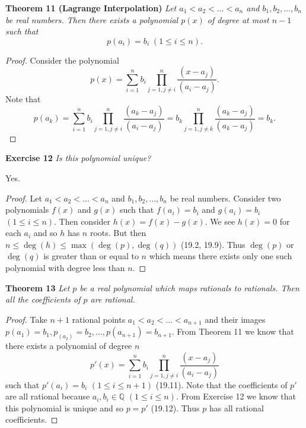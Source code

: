 \documentclass{article}
\begin{document}
\begin{flushleft}
\textbf{Theorem 11 (Lagrange Interpolation)}
\textsl{Let $a_1 < a_2 < \dots < a_n$ and $b_1, b_2, \dots , b_n$ be real numbers. Then there exists a polynomial $p(x)$ of degree at most $n-1$ such that
\[
p(a_i) = b_i \; (1 \leq i \leq n).
\]}
\begin{proof}
Consider the polynomial
\[
p(x) = \sum_{i=1}^n b_i \prod_{j=1, j \neq i}^n \frac{(x-a_j)}{(a_i-a_j)}.
\]
Note that
\[
p(a_k) = \sum_{i=1}^n b_i \prod_{j=1, j \neq i}^n \frac{(a_k-a_j)}{(a_i-a_j)} = b_k \prod_{j=1, j \neq k}^n \frac{(a_k-a_j)}{(a_k-a_j)} = b_k.
\]
\end{proof}

\textbf{Exercise 12}
\textsl{Is this polynomial unique?}\newline

Yes.
\begin{proof}
Let $a_1 < a_2 < \dots < a_n$ and $b_1, b_2, \dots , b_n$ be real numbers. Consider two polynomials $f(x)$ and $g(x)$ such that $f(a_i) = b_i$ and $g(a_i) = b_i$ $(1 \leq i \leq n)$. Then consider $h(x) = f(x) - g(x)$. We see $h(x) = 0$ for each $a_i$ and so $h$ has $n$ roots. But then $n \leq \deg(h) \leq \max(\deg(p), \deg(q))$ (19.2, 19.9). Thus $\deg(p)$ or $\deg(q)$ is greater than or equal to $n$ which means there exists only one such polynomial with degree less than $n$.
\end{proof}

\textbf{Theorem 13}
\textsl{Let $p$ be a real polynomial which maps rationals to rationals. Then all the coefficients of $p$ are rational.}
\begin{proof}
Take $n+1$ rational points $a_1 < a_2 < \dots < a_{n+1}$ and their images $p(a_1) = b_1, p_(a_2) = b_2, \dots , p(a_{n+1}) = b_{n+1}$. From Theorem 11 we know that there exists a polynomial of degree $n$
\[
p'(x) = \sum_{i=1}^n b_i \prod_{j=1, j \neq i}^n \frac{(x-a_j)}{(a_i-a_j)}
\]
such that $p'(a_i) = b_i$ $(1 \leq i \leq n+1)$ (19.11). Note that the coefficients of $p'$ are all rational because $a_i,b_i \in \mathbb{Q}$ $(1 \leq i \leq n)$. From Exercise 12 we know that this polynomial is unique and so $p=p'$ (19.12). Thus $p$ has all rational coefficients.
\end{proof}

\end{flushleft}
\end{document}
